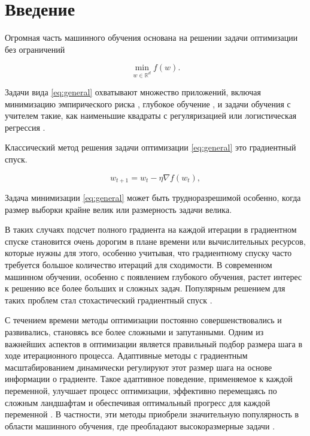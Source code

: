 \section{Введение}

Огромная часть машинного обучения основана на решении задачи оптимизации без ограничений

\begin{equation}
    \label{eq:general}
	\min_{w \in \mathbb{R}^d} f(w).
\end{equation}


Задачи вида \eqref{eq:general} охватывают множество приложений, включая минимизацию эмпирического риска \citep{chapelle2000vicinal},
глубокое обучение \citep{lecun2015deep}, и задачи обучения с учителем \citep{cunningham2008supervised} такие, как наименьшие квадраты с регуляризацией \citep{rifkin2007notes} или логистическая регрессия \citep{shalev2014understanding}.

Классический метод решения задачи оптимизации \eqref{eq:general} это градиентный спуск.

\begin{equation}
    \label{GD}
	w_{t+1} = w_t - \eta \nabla f(w_t),
\end{equation}

Задача минимизации \eqref{eq:general} может быть трудноразрешимой особенно, когда размер выборки крайне велик или размерность задачи велика.

В таких случаях подсчет полного градиента на каждой итерации в градиентном спуске становится очень дорогим в плане времени или вычислительных ресурсов, которые нужны для этого, особенно учитывая, что градиентному спуску часто требуется большое количество итераций для сходимости.
В современном машинном обучении, особенно с появлением глубокого обучения, растет интерес к решению все более больших и сложных задач. Популярным решением для таких проблем стал стохастический градиентный спуск \citep{robbins1951stochastic}.


С течением времени методы оптимизации постоянно совершенствовались и развивались, становясь все более сложными и запутанными.
Одним из важнейших аспектов в оптимизации является правильный подбор размера шага в ходе итерационного процесса.
Адаптивные методы с градиентным масштабированием динамически регулируют 
этот размер шага на основе информации о градиенте. Такое адаптивное поведение, применяемое к каждой переменной, улучшает процесс оптимизации, эффективно перемещаясь по сложным ландшафтам и обеспечивая оптимальный прогресс для каждой переменной \citep{hazan2007adaptive}. В частности, эти методы приобрели значительную популярность в области машинного обучения, где преобладают высокоразмерные задачи \citep{zhang2018three, yao2021adahessian}.

